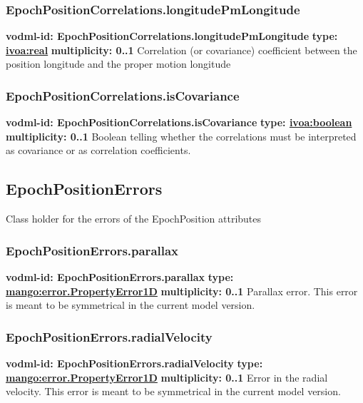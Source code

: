     \subsubsection{EpochPositionCorrelations.longitudePmLongitude}
      \textbf{vodml-id: EpochPositionCorrelations.longitudePmLongitude} \newline
      \textbf{type: \hyperref[sect:ivoa]{ivoa:real}} \newline
      \textbf{multiplicity: 0..1} \newline
      Correlation (or covariance) coefficient between the position longitude and the proper motion longitude

    \subsubsection{EpochPositionCorrelations.isCovariance}
      \textbf{vodml-id: EpochPositionCorrelations.isCovariance} \newline
      \textbf{type: \hyperref[sect:ivoa]{ivoa:boolean}} \newline
      \textbf{multiplicity: 0..1} \newline
      Boolean telling whether the correlations must be interpreted as covariance or as correlation coefficients.

  \subsection{EpochPositionErrors}
  \label{sect:EpochPositionErrors}
    Class holder for the errors of the EpochPosition attributes

    \subsubsection{EpochPositionErrors.parallax}
      \textbf{vodml-id: EpochPositionErrors.parallax} \newline
      \textbf{type: \hyperref[sect:error.PropertyError1D]{mango:error.PropertyError1D}} \newline
      \textbf{multiplicity: 0..1} \newline
      Parallax error. This error is meant to be symmetrical in the current model version.

    \subsubsection{EpochPositionErrors.radialVelocity}
      \textbf{vodml-id: EpochPositionErrors.radialVelocity} \newline
      \textbf{type: \hyperref[sect:error.PropertyError1D]{mango:error.PropertyError1D}} \newline
      \textbf{multiplicity: 0..1} \newline
      Error in the radial velocity. This error is meant to be symmetrical in the current model version.


